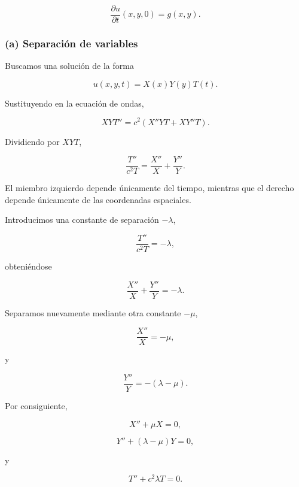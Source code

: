 \documentclass[11pt,spanish]{article}
\begin{document}
\begin{equation}
\frac{\partial u}{\partial t}(x,y,0)=g(x,y).
\end{equation}

\subsubsection*{(a) Separación de variables}

Buscamos una solución de la forma

\begin{equation}
u(x,y,t)=X(x)Y(y)T(t).
\end{equation}

Sustituyendo en la ecuación de ondas,

\[
XYT''
=
c^2
\left(
X''YT
+
XY''T
\right).
\]

Dividiendo por $XYT$,

\begin{equation}
\frac{T''}{c^2T}
=
\frac{X''}{X}
+
\frac{Y''}{Y}.
\end{equation}

El miembro izquierdo depende únicamente del tiempo, mientras que el derecho depende únicamente de las coordenadas espaciales.

Introducimos una constante de separación $-\lambda$,

\begin{equation}
\frac{T''}{c^2T}
=
-\lambda,
\end{equation}

obteniéndose

\begin{equation}
\frac{X''}{X}
+
\frac{Y''}{Y}
=
-\lambda.
\end{equation}

Separamos nuevamente mediante otra constante $-\mu$,

\begin{equation}
\frac{X''}{X}
=
-\mu,
\end{equation}

y

\begin{equation}
\frac{Y''}{Y}
=
-(\lambda-\mu).
\end{equation}

Por consiguiente,

\[
\boxed{
X''+\mu X=0,
}
\]

\[
\boxed{
Y''+(\lambda-\mu)Y=0,
}
\]

y

\[
\boxed{
T''+c^2\lambda T=0.
}
\]
\end{document}

